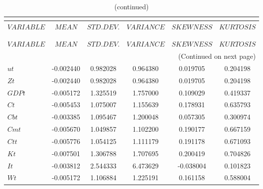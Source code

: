  
\begin{center}
\begin{longtable}{lccccc} 
\caption{MOMENTS OF SIMULATED VARIABLES}\\
 \label{Table:sim_moments}\\
\toprule 
$VARIABLE  $	 & 	 $            MEAN$	 & 	 $       STD. DEV.$	 & 	 $        VARIANCE$	 & 	 $        SKEWNESS$	 & 	 $        KURTOSIS$\\
\midrule \endfirsthead 
\caption{(continued)}\\
 \toprule \\ 
$VARIABLE  $	 & 	 $            MEAN$	 & 	 $       STD. DEV.$	 & 	 $        VARIANCE$	 & 	 $        SKEWNESS$	 & 	 $        KURTOSIS$\\
\midrule \endhead 
\midrule \multicolumn{6}{r}{(Continued on next page)} \\ \bottomrule \endfoot 
\bottomrule \endlastfoot 
$ut        $	 & 	       -0.002440	 & 	        0.982028	 & 	        0.964380	 & 	        0.019705	 & 	        0.204198 \\ 
$Zt        $	 & 	       -0.002440	 & 	        0.982028	 & 	        0.964380	 & 	        0.019705	 & 	        0.204198 \\ 
$GDPt      $	 & 	       -0.005172	 & 	        1.325519	 & 	        1.757000	 & 	        0.109029	 & 	        0.419337 \\ 
$Ct        $	 & 	       -0.005453	 & 	        1.075007	 & 	        1.155639	 & 	        0.178931	 & 	        0.635793 \\ 
$Cbt       $	 & 	       -0.003385	 & 	        1.095467	 & 	        1.200048	 & 	        0.057305	 & 	        0.300974 \\ 
$Cmt       $	 & 	       -0.005670	 & 	        1.049857	 & 	        1.102200	 & 	        0.190177	 & 	        0.667159 \\ 
$Ctt       $	 & 	       -0.005776	 & 	        1.054125	 & 	        1.111179	 & 	        0.191178	 & 	        0.671093 \\ 
$Kt        $	 & 	       -0.007501	 & 	        1.306788	 & 	        1.707695	 & 	        0.200419	 & 	        0.704826 \\ 
$It        $	 & 	       -0.003812	 & 	        2.544333	 & 	        6.473629	 & 	       -0.038004	 & 	        0.101823 \\ 
$Wt        $	 & 	       -0.005172	 & 	        1.106884	 & 	        1.225191	 & 	        0.161158	 & 	        0.588004 \\ 

\end{longtable}
\end{center}
